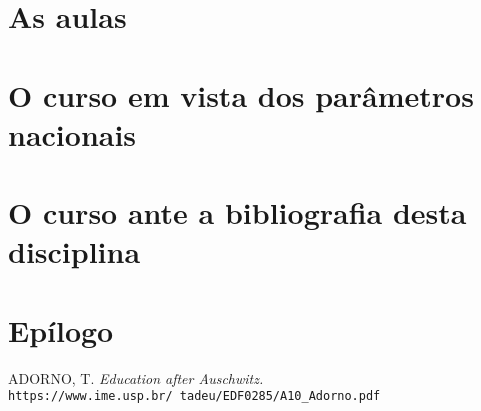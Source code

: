 \documentclass[12pt,a4paper]{article}
\begin{document}
	
	\newpage
	
	\section{As aulas}
	

	
	\newpage
		
	\section{O curso em vista dos parâmetros nacionais}
	

	

	
	\newpage
	
	\section{O curso ante a bibliografia desta disciplina}
	

	
	
	\newpage
	
	\section{Epílogo}
	

	
	\newpage
	

	
	\newpage
	
	\begin{thebibliography}{9}
		ADORNO, T. 
		\textit{Education after Auschwitz. }   
		\\\texttt{https://www.ime.usp.br/~tadeu/EDF0285/A10\_Adorno.pdf}
		
		
	\end{thebibliography}
\end{document}
